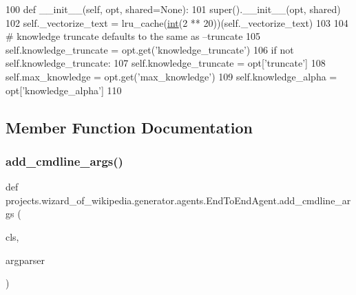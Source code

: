\begin{DoxyCode}
100     \textcolor{keyword}{def }\_\_init\_\_(self, opt, shared=None):
101         super().\_\_init\_\_(opt, shared)
102         self.\_vectorize\_text = lru\_cache(\hyperlink{namespacelanguage__model_1_1eval__ppl_a7d12ee00479673c5c8d1f6d01faa272a}{int}(2 ** 20))(self.\_vectorize\_text)
103 
104         \textcolor{comment}{# knowledge truncate defaults to the same as --truncate}
105         self.knowledge\_truncate = opt.get(\textcolor{stringliteral}{'knowledge\_truncate'})
106         \textcolor{keywordflow}{if} \textcolor{keywordflow}{not} self.knowledge\_truncate:
107             self.knowledge\_truncate = opt[\textcolor{stringliteral}{'truncate'}]
108         self.max\_knowledge = opt.get(\textcolor{stringliteral}{'max\_knowledge'})
109         self.knowledge\_alpha = opt[\textcolor{stringliteral}{'knowledge\_alpha'}]
110 
\end{DoxyCode}


\subsection{Member Function Documentation}
\mbox{\label{classprojects_1_1wizard__of__wikipedia_1_1generator_1_1agents_1_1EndToEndAgent_ad602e5c8fc8c07391faa8730b665eb7c}} 
\subsubsection{\texorpdfstring{add\+\_\+cmdline\+\_\+args()}{add\_cmdline\_args()}}
{\footnotesize\ttfamily def projects.\+wizard\+\_\+of\+\_\+wikipedia.\+generator.\+agents.\+End\+To\+End\+Agent.\+add\+\_\+cmdline\+\_\+args (\begin{DoxyParamCaption}\item[{}]{cls,  }\item[{}]{argparser }\end{DoxyParamCaption})}



